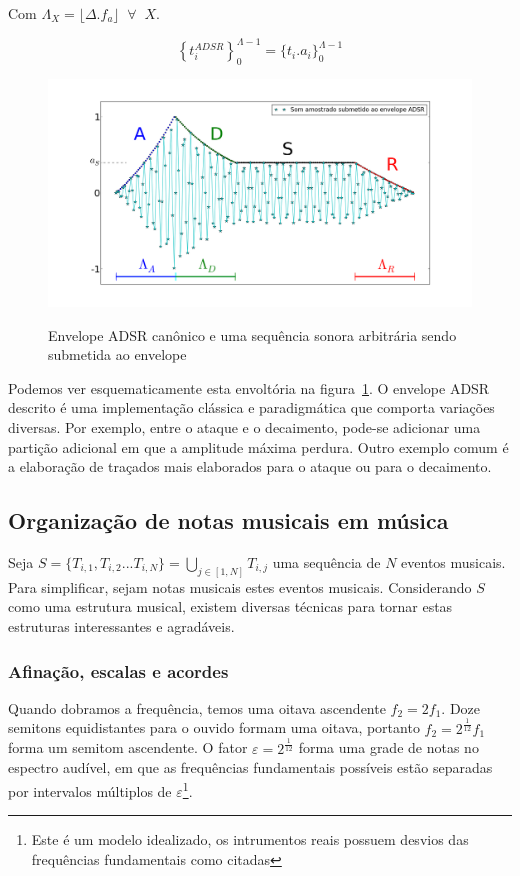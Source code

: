 Com $\Lambda_X=\lfloor \Delta . f_a \rfloor\;\;\forall\;\; X$.

\begin{equation}
\left\{t_i^{ADSR}\right\}_0^{\Lambda-1} =\{t_i . a_i\}_0^{\Lambda-1}
\end{equation}

\begin{figure}[htpq!]
    \centering
    \caption{Envelope ADSR canônico e uma sequência sonora arbitrária sendo submetida ao envelope}
        \includegraphics[width=\textwidth]{figuras/adsr}
        \label{fig:adsr}
\end{figure}


Podemos ver esquematicamente esta envoltória na figura~\ref{fig:adsr}. O envelope ADSR descrito é
uma implementação clássica e paradigmática que comporta variações diversas. Por exemplo,
entre o ataque e o decaimento, pode-se adicionar uma partição adicional em que a amplitude
máxima perdura. Outro exemplo comum é a elaboração de traçados mais elaborados para o
ataque ou para o decaimento.



\clearpage
\subsection{Organização de notas musicais em música}
Seja $ S=\{T_{i,1},T_{i,2}...T_{i,N}\} =\bigcup_{j \in [1,N]} T_{i,j} $ uma sequência de $N$ eventos
musicais. Para simplificar, sejam notas musicais estes eventos musicais.
Considerando $S$ como uma estrutura musical, existem diversas técnicas
para tornar estas estruturas interessantes e agradáveis.

\subsubsection{Afinação, escalas e acordes}
Quando dobramos a frequência, temos uma oitava ascendente $f_2=2f_1$.
Doze semitons equidistantes para o ouvido formam uma oitava,
portanto $f_2=2^{\frac{1}{12}}f_1$ forma um semitom ascendente.
O fator $\varepsilon=2^{\frac{1}{12}}$ forma uma grade de notas
no espectro audível, em que as frequências fundamentais possíveis
estão separadas por intervalos múltiplos de $\varepsilon$\footnote{Este
é um modelo idealizado, os intrumentos reais possuem desvios das frequências
fundamentais como citadas}.

